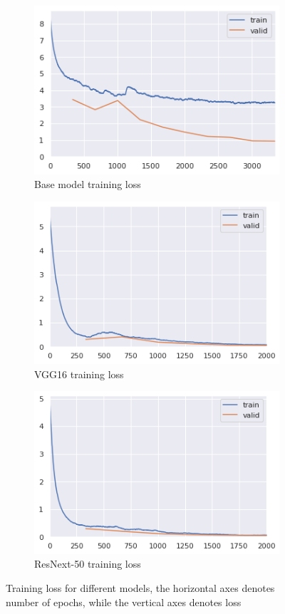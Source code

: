 \documentclass{beamer}
\begin{document}
\begin{frame}[allowframebreaks]
\begin{figure}[H]
\begin{subfigure}[t]{.5\textwidth}
\centering
\includegraphics[scale=0.5]{png/base_model_loss.png}
\caption{Base model training loss}
\label{subfig:base_loss}
\end{subfigure}
\hfill
\begin{subfigure}[t]{.5\textwidth}
\centering
\includegraphics[scale=0.5]{png/vgg_loss.png}
\caption{VGG16 training loss}
\label{subfig:vgg_loss}
\end{subfigure}
\medskip
\begin{subfigure}[t]{\textwidth}
\centering
\includegraphics[scale=0.5]{png/resnext_loss.png}
\caption{ResNext-50 training loss}
\label{subfig:resnext_loss}
\end{subfigure}
\caption{Training loss for different models, the horizontal axes denotes number of epochs, while the vertical axes denotes loss}
\label{fig:models_loss}
\end{figure} 
\end{frame}
\end{document}
